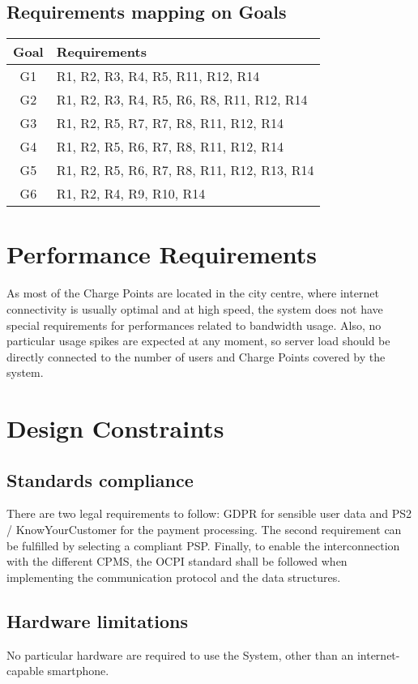 \subsection{Requirements mapping on Goals}
\begin{tabular}{|c|l|}
	\hline
	\bf{Goal} & \bf{Requirements}\\
	\hline
	G1 & R1, R2, R3, R4, R5, R11, R12, R14 \\
	G2 & R1, R2, R3, R4, R5, R6, R8, R11, R12, R14 \\
	G3 & R1, R2, R5, R7, R7, R8, R11, R12, R14 \\
	G4 & R1, R2, R5, R6, R7, R8, R11, R12, R14 \\
	G5 & R1, R2, R5, R6, R7, R8, R11, R12, R13, R14 \\
	G6 & R1, R2, R4, R9, R10, R14 \\
	\hline
\end{tabular}

\clearpage
\newpage

\section{Performance Requirements}
As most of the Charge Points are located in the city centre, where internet connectivity is usually optimal and at high speed, the system does not have special requirements for performances related to bandwidth usage. 
Also, no particular usage spikes are expected at any moment, so server load should be directly connected to the number of users and Charge Points covered by the system.

\section{Design Constraints}
\subsection{Standards compliance}
There are two legal requirements to follow:
GDPR for sensible user data and PS2 / KnowYourCustomer for the payment processing. The second requirement can be fulfilled by selecting a compliant PSP.
Finally, to enable the interconnection with the different CPMS, the OCPI standard shall be followed when implementing the communication protocol and the data structures.

\subsection{Hardware limitations}
No particular hardware are required to use the System, other than an internet-capable smartphone.

